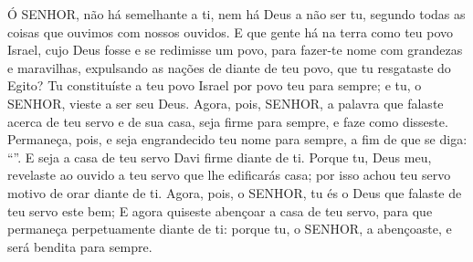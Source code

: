 {{  Ó SENHOR, não há semelhante a ti, nem há Deus a não ser tu, segundo todas as coisas que ouvimos com nossos ouvidos.
  E que gente há na terra como teu povo Israel, cujo Deus fosse e se redimisse um povo, para fazer-te nome com grandezas e maravilhas, expulsando as nações de diante de teu povo, que tu resgataste do Egito?
  Tu constituíste a teu povo Israel por povo teu para sempre; e tu, o SENHOR, vieste a ser seu Deus.
  Agora, pois, SENHOR, a palavra que falaste acerca de teu servo e de sua casa, seja firme para sempre, e faze como disseste.
  Permaneça, pois, e seja engrandecido teu nome para sempre, a fim de que se diga: \enquote{}. E seja a casa de teu servo Davi firme diante de ti.
  Porque tu, Deus meu, revelaste ao ouvido a teu servo que lhe edificarás casa; por isso achou teu servo motivo de orar diante de ti.
  Agora, pois, o SENHOR, tu és o Deus que falaste de teu servo este bem;
  E agora quiseste abençoar a casa de teu servo, para que permaneça perpetuamente diante de ti: porque tu, o SENHOR, a abençoaste, e será bendita para sempre}.
\par }

